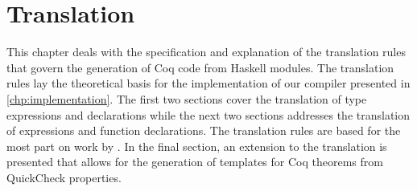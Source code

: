 \chapter{Translation} \label{chp:translation}
This chapter deals with the specification and explanation of the translation rules that govern the generation of Coq code from Haskell modules.
The translation rules lay the theoretical basis for the implementation of our compiler presented in \autoref{chp:implementation}.
The first two sections cover the translation of type expressions and declarations while the next two sections addresses the translation of expressions and function declarations.
The translation rules are based for the most part on work by \cite{Abel:2005}.
In the final section, an extension to the translation is presented that allows for the generation of templates for Coq theorems from QuickCheck properties.






